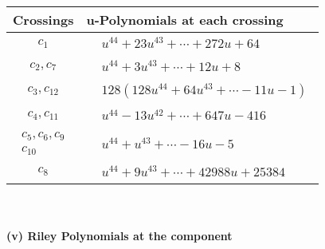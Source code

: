 \documentclass[1p]{elsarticle_modified}
\theoremstyle{definition}
\begin{document}
\begin{tabular}{m{50pt}|m{274pt}}
Crossings & \hspace{64pt}u-Polynomials at each crossing \\
\hline $$\begin{aligned}c_{1}\end{aligned}$$&$\begin{aligned}
&u^{44}+23 u^{43}+\cdots+272 u+64
\end{aligned}$\\
\hline $$\begin{aligned}c_{2},c_{7}\end{aligned}$$&$\begin{aligned}
&u^{44}+3 u^{43}+\cdots+12 u+8
\end{aligned}$\\
\hline $$\begin{aligned}c_{3},c_{12}\end{aligned}$$&$\begin{aligned}
&128(128 u^{44}+64 u^{43}+\cdots-11 u-1)
\end{aligned}$\\
\hline $$\begin{aligned}c_{4},c_{11}\end{aligned}$$&$\begin{aligned}
&u^{44}-13 u^{42}+\cdots+647 u-416
\end{aligned}$\\
\hline $$\begin{aligned}c_{5},c_{6},c_{9}\\c_{10}\end{aligned}$$&$\begin{aligned}
&u^{44}+u^{43}+\cdots-16 u-5
\end{aligned}$\\
\hline $$\begin{aligned}c_{8}\end{aligned}$$&$\begin{aligned}
&u^{44}+9 u^{43}+\cdots+42988 u+25384
\end{aligned}$\\
\hline
\end{tabular}\\~\\
\newpage\renewcommand{\arraystretch}{1}
\flushleft \textbf{(v) Riley Polynomials at the component}\newline \\
\end{document}

